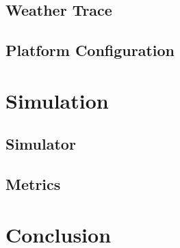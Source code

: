 \subsection{Weather Trace}

\subsection{Platform Configuration}

\section{Simulation}

\subsection{Simulator}

\subsection{Metrics}

\section{Conclusion}